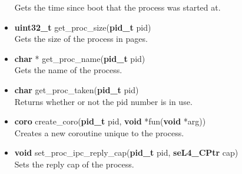 \documentclass[12pt]{article}
\begin{document}
\begin{itemize}
Gets the time since boot that the process was started at.
\item \textbf{uint32\_t} get\_proc\_size(\textbf{pid\_t} pid)\\
Gets the size of the process in pages.
\item \textbf{char} * get\_proc\_name(\textbf{pid\_t} pid)\\
Gets the name of the process.
\item \textbf{char} get\_proc\_taken(\textbf{pid\_t} pid)\\
Returns whether or not the pid number is in use.
\item \textbf{coro} create\_coro(\textbf{pid\_t} pid, \textbf{void} *fun(\textbf{void} *arg))\\
Creates a new coroutine unique to the process.
\item \textbf{void} set\_proc\_ipc\_reply\_cap(\textbf{pid\_t} pid, \textbf{seL4\_CPtr} cap)\\
Sets the reply cap of the process.
\end{itemize}
\end{document}
